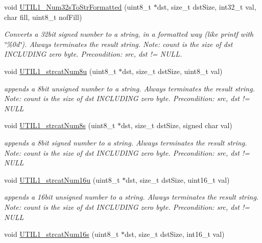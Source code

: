 \begin{DoxyCompactItemize}
void \hyperlink{group___u_t_i_l1__module_ga9acbbdd951d05627e03c464670b4985e}{U\+T\+I\+L1\+\_\+\+Num32s\+To\+Str\+Formatted} (uint8\+\_\+t $\ast$dst, size\+\_\+t dst\+Size, int32\+\_\+t val, char fill, uint8\+\_\+t nof\+Fill)
\begin{DoxyCompactList}\small\item\em Converts a 32bit signed number to a string, in a formatted way (like printf with \char`\"{}\%0d\char`\"{}). Always terminates the result string. Note\+: count is the size of dst I\+N\+C\+L\+U\+D\+I\+NG zero byte. Precondition\+: src, dst != N\+U\+LL. \end{DoxyCompactList}\item 
void \hyperlink{group___u_t_i_l1__module_ga363d82b53f80bd2a60865dea49e0d596}{U\+T\+I\+L1\+\_\+strcat\+Num8u} (uint8\+\_\+t $\ast$dst, size\+\_\+t dst\+Size, uint8\+\_\+t val)
\begin{DoxyCompactList}\small\item\em appends a 8bit unsigned number to a string. Always terminates the result string. Note\+: count is the size of dst I\+N\+C\+L\+U\+D\+I\+NG zero byte. Precondition\+: src, dst != N\+U\+LL \end{DoxyCompactList}\item 
void \hyperlink{group___u_t_i_l1__module_gabb1f0070273e9202210a022f0eeeff18}{U\+T\+I\+L1\+\_\+strcat\+Num8s} (uint8\+\_\+t $\ast$dst, size\+\_\+t dst\+Size, signed char val)
\begin{DoxyCompactList}\small\item\em appends a 8bit signed number to a string. Always terminates the result string. Note\+: count is the size of dst I\+N\+C\+L\+U\+D\+I\+NG zero byte. Precondition\+: src, dst != N\+U\+LL \end{DoxyCompactList}\item 
void \hyperlink{group___u_t_i_l1__module_ga0716493ba0c299b7b50fb5525d94176f}{U\+T\+I\+L1\+\_\+strcat\+Num16u} (uint8\+\_\+t $\ast$dst, size\+\_\+t dst\+Size, uint16\+\_\+t val)
\begin{DoxyCompactList}\small\item\em appends a 16bit unsigned number to a string. Always terminates the result string. Note\+: count is the size of dst I\+N\+C\+L\+U\+D\+I\+NG zero byte. Precondition\+: src, dst != N\+U\+LL \end{DoxyCompactList}\item 
void \hyperlink{group___u_t_i_l1__module_gaec27c4f9d9b48fde67d9270f63c8aee5}{U\+T\+I\+L1\+\_\+strcat\+Num16s} (uint8\+\_\+t $\ast$dst, size\+\_\+t dst\+Size, int16\+\_\+t val)

\end{DoxyCompactItemize}
